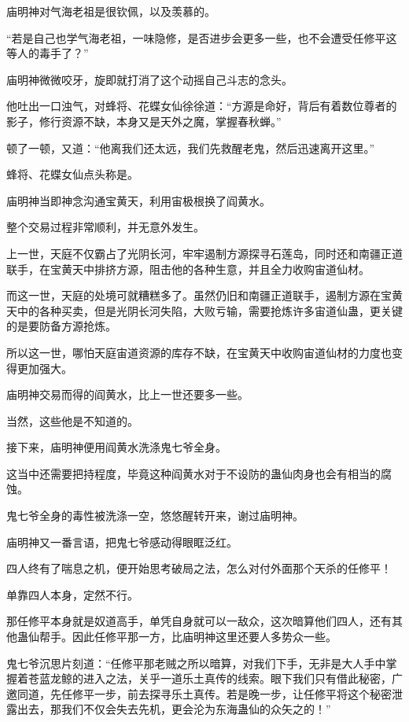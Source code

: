 \begin{this_body}
庙明神对气海老祖是很钦佩，以及羡慕的。

“若是自己也学气海老祖，一味隐修，是否进步会更多一些，也不会遭受任修平这等人的毒手了？”

庙明神微微咬牙，旋即就打消了这个动摇自己斗志的念头。

他吐出一口浊气，对蜂将、花蝶女仙徐徐道：“方源是命好，背后有着数位尊者的影子，修行资源不缺，本身又是天外之魔，掌握春秋蝉。”

顿了一顿，又道：“他离我们还太远，我们先救醒老鬼，然后迅速离开这里。”

蜂将、花蝶女仙点头称是。

庙明神当即神念沟通宝黄天，利用宙极根换了阎黄水。

整个交易过程非常顺利，并无意外发生。

上一世，天庭不仅霸占了光阴长河，牢牢遏制方源探寻石莲岛，同时还和南疆正道联手，在宝黄天中排挤方源，阻击他的各种生意，并且全力收购宙道仙材。

而这一世，天庭的处境可就糟糕多了。虽然仍旧和南疆正道联手，遏制方源在宝黄天中的各种买卖，但是光阴长河失陷，大败亏输，需要抢炼许多宙道仙蛊，更关键的是要防备方源抢炼。

所以这一世，哪怕天庭宙道资源的库存不缺，在宝黄天中收购宙道仙材的力度也变得更加强大。

庙明神交易而得的阎黄水，比上一世还要多一些。

当然，这些他是不知道的。

接下来，庙明神便用阎黄水洗涤鬼七爷全身。

这当中还需要把持程度，毕竟这种阎黄水对于不设防的蛊仙肉身也会有相当的腐蚀。

鬼七爷全身的毒性被洗涤一空，悠悠醒转开来，谢过庙明神。

庙明神又一番言语，把鬼七爷感动得眼眶泛红。

四人终有了喘息之机，便开始思考破局之法，怎么对付外面那个天杀的任修平！

单靠四人本身，定然不行。

那任修平本身就是奴道高手，单凭自身就可以一敌众，这次暗算他们四人，还有其他蛊仙帮手。因此任修平那一方，比庙明神这里还要人多势众一些。

鬼七爷沉思片刻道：“任修平那老贼之所以暗算，对我们下手，无非是大人手中掌握着苍蓝龙鲸的进入之法，关乎一道乐土真传的线索。眼下我们只有借此秘密，广邀同道，先任修平一步，前去探寻乐土真传。若是晚一步，让任修平将这个秘密泄露出去，那我们不仅会失去先机，更会沦为东海蛊仙的众矢之的！”


\end{this_body}
